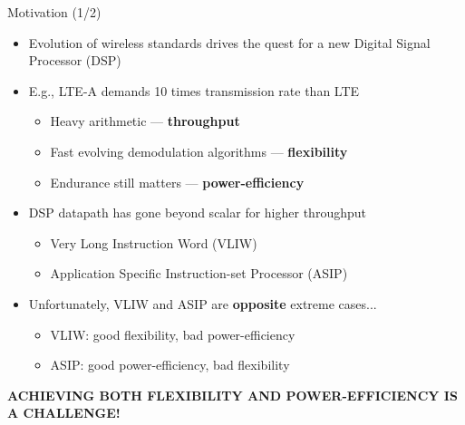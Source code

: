 \documentclass{beamer}
\begin{document}
\begin{CJK}{UTF8}{bkai}
    \begin{frame}{Motivation (1/2)}
        \begin{itemize}
            \pause
            \item {
                    Evolution of wireless standards drives the quest for a new Digital Signal Processor (DSP)
                }
            \pause
            \item {
                    E.g., LTE-A demands 10 times transmission rate than LTE
                    \begin{itemize}
                        \item {
                                Heavy arithmetic --- \textbf{throughput}
                            }
                        \item {
                                Fast evolving demodulation algorithms --- \textbf{flexibility}
                            }
                        \item {
                                Endurance still matters --- \textbf{power-efficiency}
                            }
                    \end{itemize}
                }
            \pause
            \item { 
                    DSP datapath has gone beyond scalar for higher throughput
                    \begin{itemize}
                        \item Very Long Instruction Word (VLIW)
                        \item Application Specific Instruction-set Processor (ASIP)
                    \end{itemize}
                }
            \pause
            \item {
                    Unfortunately, VLIW and ASIP are \textbf{opposite} extreme cases...
                    \begin{itemize}
                        \item VLIW: good flexibility, bad power-efficiency
                        \item ASIP: good power-efficiency, bad flexibility
                    \end{itemize}
                }
        \end{itemize}
        \pause
        \begin{center}
        \large{\textbf{ACHIEVING BOTH FLEXIBILITY AND POWER-EFFICIENCY IS A CHALLENGE!}}
        \end{center}
    \end{frame}


\end{CJK}
\end{document}
